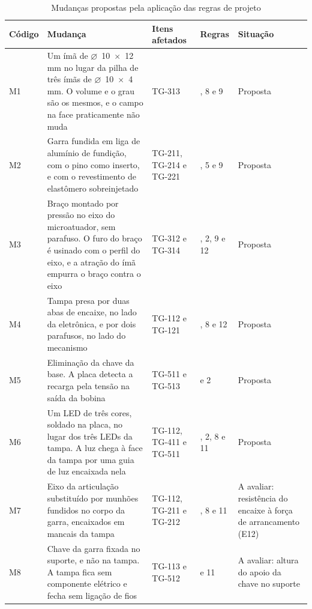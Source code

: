\begin{table}[!htb]
    \centering
    \caption{Mudanças propostas pela aplicação das regras de projeto}
    \label{tab:dfma_mudancas}
    \footnotesize
    \renewcommand{\arraystretch}{1.3}
    \begin{tabularx}{\textwidth}{@{}
        >{\RaggedRight\arraybackslash}p{1.1cm}
        >{\RaggedRight\arraybackslash}X
        >{\RaggedRight\arraybackslash}p{2.3cm}
        >{\RaggedRight\arraybackslash}p{1.3cm}
        >{\RaggedRight\arraybackslash}p{2.6cm}@{}}
        \toprule
        \textbf{Código} & \textbf{Mudança} & \textbf{Itens afetados} & \textbf{Regras} & \textbf{Situação} \\
        \midrule
        M1 & Um ímã de $\varnothing$~10~$\times$~12 mm no lugar da pilha de três ímãs de $\varnothing$~10~$\times$~4 mm. O volume e o grau são os mesmos, e o campo na face praticamente não muda & TG-313 & 1, 8 e 9 & Proposta \\
        M2 & Garra fundida em liga de alumínio de fundição, com o pino como inserto, e com o revestimento de elastômero sobreinjetado & TG-211, TG-214 e TG-221 & 1, 5 e 9 & Proposta \\
        M3 & Braço montado por pressão no eixo do microatuador, sem parafuso. O furo do braço é usinado com o perfil do eixo, e a atração do ímã empurra o braço contra o eixo & TG-312 e TG-314 & 1, 2, 9 e 12 & Proposta \\
        M4 & Tampa presa por duas abas de encaixe, no lado da eletrônica, e por dois parafusos, no lado do mecanismo & TG-112 e TG-121 & 1, 8 e 12 & Proposta \\
        M5 & Eliminação da chave da base. A placa detecta a recarga pela tensão na saída da bobina & TG-511 e TG-513 & 1 e 2 & Proposta \\
        M6 & Um LED de três cores, soldado na placa, no lugar dos três LEDs da tampa. A luz chega à face da tampa por uma guia de luz encaixada nela & TG-112, TG-411 e TG-511 & 1, 2, 8 e 11 & Proposta \\
        M7 & Eixo da articulação substituído por munhões fundidos no corpo da garra, encaixados em mancais da tampa & TG-112, TG-211 e TG-212 & 1, 8 e 11 & A avaliar: resistência do encaixe à força de arrancamento (E12) \\
        M8 & Chave da garra fixada no suporte, e não na tampa. A tampa fica sem componente elétrico e fecha sem ligação de fios & TG-113 e TG-512 & 8 e 11 & A avaliar: altura do apoio da chave no suporte \\
        \bottomrule
    \end{tabularx}
\end{table}

